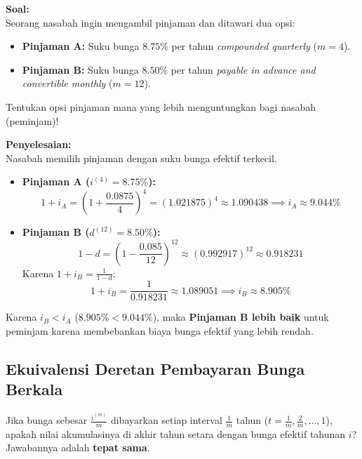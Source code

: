 \documentclass[11pt,a4paper]{article}
\begin{document}
\begin{examplebox}
\textbf{Soal:}\\
Seorang nasabah ingin mengambil pinjaman dan ditawari dua opsi:
\begin{itemize}
    \item \textbf{Pinjaman A:} Suku bunga $8.75\%$ per tahun \textit{compounded quarterly} ($m=4$).
    \item \textbf{Pinjaman B:} Suku bunga $8.50\%$ per tahun \textit{payable in advance and convertible monthly} ($m=12$).
\end{itemize}
Tentukan opsi pinjaman mana yang lebih menguntungkan bagi nasabah (peminjam)!

\vspace{0.5em}
\textbf{Penyelesaian:}\\
Nasabah memilih pinjaman dengan suku bunga efektif terkecil.
\begin{itemize}
    \item \textbf{Pinjaman A ($i^{(4)} = 8.75\%$):}
    \begin{equation*}
        1 + i_A = \left(1 + \frac{0.0875}{4}\right)^4 = (1.021875)^4 \approx 1.090438 \implies i_A \approx 9.044\%
    \end{equation*}
    \item \textbf{Pinjaman B ($d^{(12)} = 8.50\%$):}
    \begin{equation*}
        1 - d = \left(1 - \frac{0.085}{12}\right)^{12} \approx (0.992917)^{12} \approx 0.918231
    \end{equation*}
    Karena $1 + i_B = \frac{1}{1 - d}$:
    \begin{equation*}
        1 + i_B = \frac{1}{0.918231} \approx 1.089051 \implies i_B \approx 8.905\%
    \end{equation*}
\end{itemize}
Karena $i_B < i_A$ ($8.905\% < 9.044\%$), maka \textbf{Pinjaman B lebih baik} untuk peminjam karena membebankan biaya bunga efektif yang lebih rendah.
\end{examplebox}

\subsection{Ekuivalensi Deretan Pembayaran Bunga Berkala}
Jika bunga sebesar $\frac{i^{(m)}}{m}$ dibayarkan setiap interval $\frac{1}{m}$ tahun ($t = \frac{1}{m}, \frac{2}{m}, \dots, 1$), apakah nilai akumulasinya di akhir tahun setara dengan bunga efektif tahunan $i$? Jawabannya adalah \textbf{tepat sama}.
\end{document}
